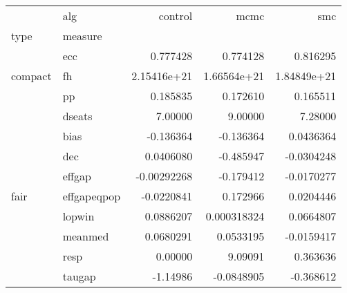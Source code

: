\begin{tabular}{llrrr}
\toprule
     & alg &     control &        mcmc &         smc \\
type & measure &             &             &             \\
\midrule
\multirow{3}{*}{compact} & ecc &    0.777428 &    0.774128 &    0.816295 \\
     & fh & 2.15416e+21 & 1.66564e+21 & 1.84849e+21 \\
     & pp &    0.185835 &    0.172610 &    0.165511 \\
\cline{1-5}
\multirow{9}{*}{fair} & dseats &     7.00000 &     9.00000 &     7.28000 \\
     & bias &   -0.136364 &   -0.136364 &   0.0436364 \\
     & dec &   0.0406080 &   -0.485947 &  -0.0304248 \\
     & effgap & -0.00292268 &   -0.179412 &  -0.0170277 \\
     & effgapeqpop &  -0.0220841 &    0.172966 &   0.0204446 \\
     & lopwin &   0.0886207 & 0.000318324 &   0.0664807 \\
     & meanmed &   0.0680291 &   0.0533195 &  -0.0159417 \\
     & resp &     0.00000 &     9.09091 &    0.363636 \\
     & taugap &    -1.14986 &  -0.0848905 &   -0.368612 \\
\bottomrule
\end{tabular}
